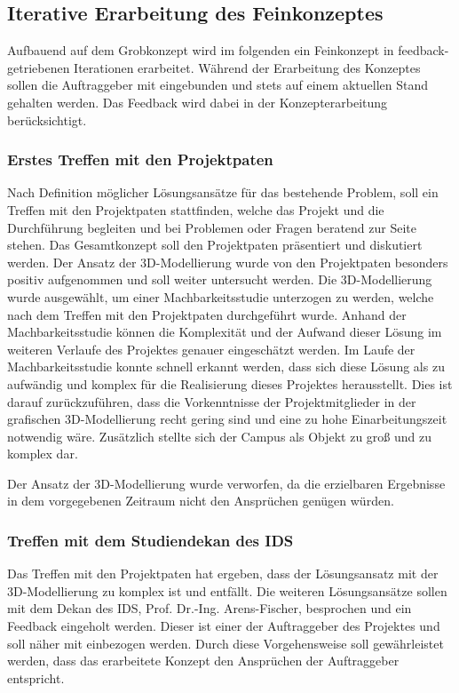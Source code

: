 \subsection{Iterative Erarbeitung des Feinkonzeptes}
\label{sec:ErarbeitungFeinkonzept}

Aufbauend auf dem Grobkonzept wird im folgenden ein Feinkonzept in feedback-getriebenen Iterationen erarbeitet.
Während der Erarbeitung des Konzeptes sollen die Auftraggeber mit eingebunden und stets auf einem aktuellen
Stand gehalten werden. Das Feedback wird dabei in der Konzepterarbeitung berücksichtigt.


\subsubsection*{Erstes Treffen mit den Projektpaten}
\label{sec:Treffen1}

Nach Definition möglicher Lösungsansätze für das bestehende Problem, soll ein Treffen mit den Projektpaten stattfinden, 
welche das Projekt und die Durchführung begleiten und bei Problemen oder Fragen beratend zur Seite stehen. Das 
Gesamtkonzept soll den Projektpaten präsentiert und diskutiert werden. Der Ansatz der 3D-Modellierung wurde von den 
Projektpaten besonders positiv aufgenommen und soll weiter untersucht werden. 
Die 3D-Modellierung wurde ausgewählt, um einer Machbarkeitsstudie unterzogen zu werden, welche nach dem Treffen mit den 
Projektpaten durchgeführt wurde. Anhand der Machbarkeitsstudie können die Komplexität und der Aufwand dieser Lösung im 
weiteren Verlaufe des Projektes genauer eingeschätzt werden.
Im Laufe der Machbarkeitsstudie konnte schnell erkannt werden, dass sich diese Lösung als zu aufwändig und komplex für die 
Realisierung dieses Projektes herausstellt. Dies ist darauf zurückzuführen, dass die Vorkenntnisse der Projektmitglieder 
in der grafischen 3D-Modellierung recht gering sind und eine zu hohe Einarbeitungszeit notwendig wäre. Zusätzlich stellte 
sich der Campus als Objekt zu groß und zu komplex dar. 

Der Ansatz der 3D-Modellierung wurde verworfen, da die erzielbaren Ergebnisse in dem vorgegebenen Zeitraum nicht den 
Ansprüchen genügen würden.


\subsubsection*{Treffen mit dem Studiendekan des IDS}
\label{sec:Treffen2}

Das Treffen mit den Projektpaten hat ergeben, dass der Lösungsansatz mit der 3D-Modellierung zu komplex ist und entfällt.
 Die weiteren Lösungsansätze sollen mit dem Dekan des IDS, Prof. Dr.-Ing. Arens-Fischer, besprochen und ein Feedback 
eingeholt werden. Dieser ist einer der Auftraggeber des Projektes und soll näher mit einbezogen werden. Durch diese 
Vorgehensweise soll gewährleistet werden, dass das erarbeitete Konzept den Ansprüchen der Auftraggeber entspricht.

